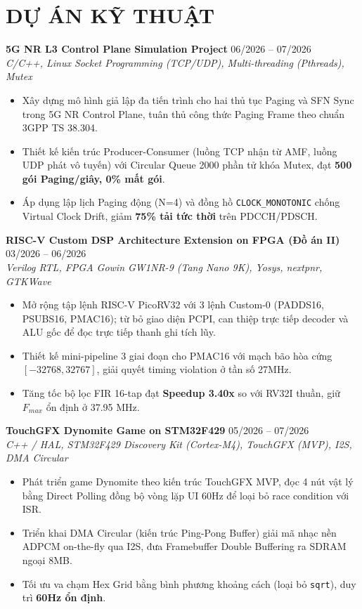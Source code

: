 \documentclass[a4paper,11pt]{article}
\begin{document}
\section{DỰ ÁN KỸ THUẬT}

\textbf{5G NR L3 Control Plane Simulation Project} \hfill 06/2026 -- 07/2026 \\
\textit{C/C++, Linux Socket Programming (TCP/UDP), Multi-threading (Pthreads), Mutex}
\begin{itemize}[leftmargin=*, noitemsep]
    \item Xây dựng mô hình giả lập đa tiến trình cho hai thủ tục Paging và SFN Sync trong 5G NR Control Plane, tuân thủ công thức Paging Frame theo chuẩn 3GPP TS 38.304.
    \item Thiết kế kiến trúc Producer-Consumer (luồng TCP nhận từ AMF, luồng UDP phát vô tuyến) với Circular Queue 2000 phần tử khóa Mutex, đạt \textbf{500 gói Paging/giây, 0\% mất gói}.
    \item Áp dụng lập lịch Paging động (N=4) và đồng hồ \texttt{CLOCK\_MONOTONIC} chống Virtual Clock Drift, giảm \textbf{75\% tải tức thời} trên PDCCH/PDSCH.
\end{itemize}

\vspace{6pt}

\textbf{RISC-V Custom DSP Architecture Extension on FPGA (Đồ án II)} \hfill 03/2026 -- 06/2026 \\
\textit{Verilog RTL, FPGA Gowin GW1NR-9 (Tang Nano 9K), Yosys, nextpnr, GTKWave}
\begin{itemize}[leftmargin=*, noitemsep]
    \item Mở rộng tập lệnh RISC-V PicoRV32 với 3 lệnh Custom-0 (PADDS16, PSUBS16, PMAC16); từ bỏ giao diện PCPI, can thiệp trực tiếp decoder và ALU gốc để đọc trực tiếp thanh ghi tích lũy.
    \item Thiết kế mini-pipeline 3 giai đoạn cho PMAC16 với mạch bão hòa cứng $[-32768, 32767]$, giải quyết timing violation ở tần số 27MHz.
    \item Tăng tốc bộ lọc FIR 16-tap đạt \textbf{Speedup 3.40x} so với RV32I thuần, giữ $F_{max}$ ổn định ở 37.95 MHz.
\end{itemize}

\vspace{6pt}

\textbf{TouchGFX Dynomite Game on STM32F429} \hfill 05/2026 -- 07/2026 \\
\textit{C++ / HAL, STM32F429 Discovery Kit (Cortex-M4), TouchGFX (MVP), I2S, DMA Circular}
\begin{itemize}[leftmargin=*, noitemsep]
    \item Phát triển game Dynomite theo kiến trúc TouchGFX MVP, đọc 4 nút vật lý bằng Direct Polling đồng bộ vòng lặp UI 60Hz để loại bỏ race condition với ISR.
    \item Triển khai DMA Circular (kiến trúc Ping-Pong Buffer) giải mã nhạc nền ADPCM on-the-fly qua I2S, đưa Framebuffer Double Buffering ra SDRAM ngoại 8MB.
    \item Tối ưu va chạm Hex Grid bằng bình phương khoảng cách (loại bỏ \texttt{sqrt}), duy trì \textbf{60Hz ổn định}.
\end{itemize}
\end{document}
